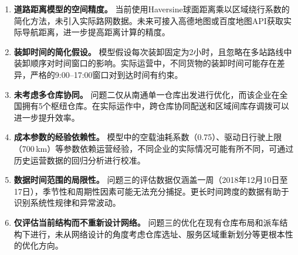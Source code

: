 \begin{enumerate}
    \item \textbf{道路距离模型的空间精度。} 当前使用Haversine球面距离乘以区域绕行系数的简化方法，未引入实际路网数据。未来可接入高德地图或百度地图API获取实际导航距离，进一步提高距离计算的精度。
    \item \textbf{装卸时间的简化假设。} 模型假设每次装卸固定为2小时，且忽略在多站路线中装卸顺序对时间窗口的影响。实际运营中，不同货物的装卸时间可能存在差异，严格的9:00–17:00窗口对到达时间有约束。
    \item \textbf{未考虑多仓库协同。} 问题二仅从南通单一仓库出发进行优化，而该企业在全国拥有5个枢纽仓库。在实际运作中，跨仓库协同配送和区域间库存调拨可以进一步提升效率。
    \item \textbf{成本参数的经验依赖性。} 模型中的空载油耗系数（0.75）、驱动日行驶上限（700\,km）等参数依赖运营经验，不同企业的实际情况可能有所不同，可通过历史运营数据的回归分析进行校准。
    \item \textbf{数据时间范围的局限性。} 问题三的评估数据仅涵盖一周（2018年12月10日至17日），季节性和周期性因素可能无法充分捕捉。更长时间跨度的数据有助于识别系统性规律和异常波动。
    \item \textbf{仅评估当前结构而不重新设计网络。} 问题三的优化在现有仓库布局和派车结构下进行，未从网络设计的角度考虑仓库选址、服务区域重新划分等更根本性的优化方向。
\end{enumerate}
